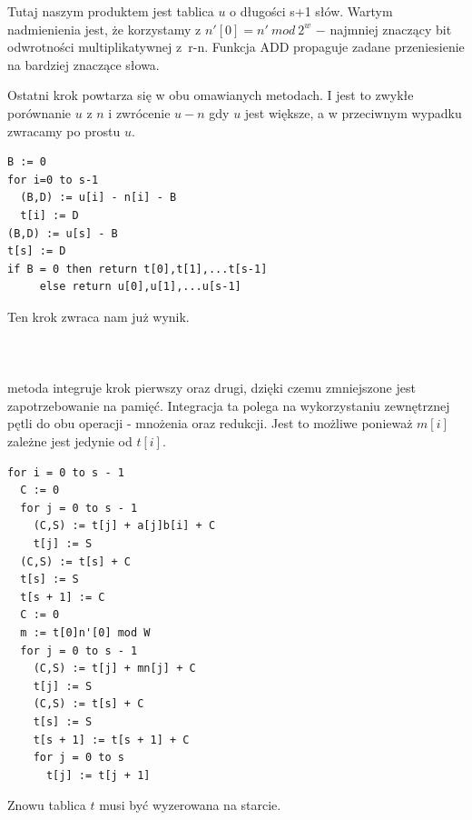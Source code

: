 \documentclass[10pt,journal,compsoc]{IEEEtran}
\begin{document}
\noindent Tutaj naszym produktem jest tablica $u$ o długości s+1 słów. Wartym nadmienienia jest, że korzystamy z $n'[0]=n'\ mod\ 2^w$ $-$ najmniej znaczący bit 
odwrotności multiplikatywnej z~r-n. Funkcja ADD propaguje zadane przeniesienie na bardziej znaczące słowa.

\noindent Ostatni krok powtarza się w obu omawianych metodach. I jest to zwykłe porównanie $u$ z $n$ i zwrócenie $u-n$ gdy $u$ jest większe, a w przeciwnym wypadku zwracamy po prostu $u$.
\begin{lstlisting}
B := 0
for i=0 to s-1
  (B,D) := u[i] - n[i] - B
  t[i] := D
(B,D) := u[s] - B
t[s] := D
if B = 0 then return t[0],t[1],...t[s-1]
	 else return u[0],u[1],...u[s-1]
\end{lstlisting} 
\noindent Ten krok zwraca nam już wynik.\\ \\ \\ \\
 metoda integruje krok pierwszy oraz drugi, dzięki czemu zmniejszone jest zapotrzebowanie na pamięć. Integracja ta polega na wykorzystaniu zewnętrznej pętli do obu operacji - mnożenia oraz redukcji. Jest to możliwe ponieważ $m[i]$ zależne jest jedynie od $t[i]$.
\begin{lstlisting}
for i = 0 to s - 1
  C := 0
  for j = 0 to s - 1
    (C,S) := t[j] + a[j]b[i] + C
    t[j] := S
  (C,S) := t[s] + C
  t[s] := S
  t[s + 1] := C
  C := 0
  m := t[0]n'[0] mod W
  for j = 0 to s - 1
    (C,S) := t[j] + mn[j] + C
    t[j] := S 
    (C,S) := t[s] + C
    t[s] := S
    t[s + 1] := t[s + 1] + C
    for j = 0 to s
      t[j] := t[j + 1]
\end{lstlisting} 
\noindent Znowu tablica $t$ musi być wyzerowana na starcie.
%
%
\end{document}
